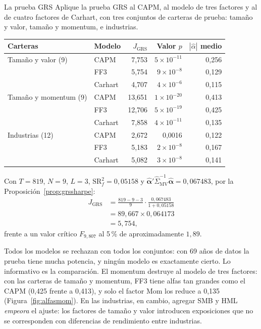 \begin{ejresuelto}{La prueba GRS}\label{ej:grs}
\enunciado Aplique la prueba GRS al CAPM, al modelo de tres factores y al de cuatro factores de Carhart, con tres conjuntos
de carteras de prueba: tamaño y valor, tamaño y momentum, e industrias.

\solucion
{}
\begin{center}\small
\begin{tabular}{@{}llrrr@{}}
\toprule
Carteras & Modelo & $J_{\text{GRS}}$ & Valor $p$ & $|\hat\alpha|$ medio \\
\midrule
Tamaño y valor (9) & CAPM & 7,753 & $5\times10^{-11}$ & 0,256 \\
 & FF3 & 5,754 & $9\times10^{-8}$ & 0,129 \\
 & Carhart & 4,707 & $4\times10^{-6}$ & 0,115 \\
Tamaño y momentum (9) & CAPM & 13,651 & $1\times10^{-20}$ & 0,413 \\
 & FF3 & 12,706 & $5\times10^{-19}$ & 0,425 \\
 & Carhart & 7,858 & $4\times10^{-11}$ & 0,135 \\
Industrias (12) & CAPM & 2,672 & 0,0016 & 0,122 \\
 & FF3 & 5,183 & $2\times10^{-8}$ & 0,167 \\
 & Carhart & 5,082 & $3\times10^{-8}$ & 0,141 \\
\bottomrule
\end{tabular}
\end{center}

 Con $T=819$, $N=9$, $L=3$, $\mathrm{SR}^2_f=0{,}05158$ y
$\hat{\boldsymbol\alpha}'\hat\Sigma_{\text{MV}}^{-1}\hat{\boldsymbol\alpha}=0{,}067483$, por la Proposición~\ref{prop:grssharpe}:
\begin{align*}
  J_{\text{GRS}} &= \frac{819-9-3}{9}\cdot\frac{0{,}067483}{1+0{,}05158}\\
                 &= 89{,}667\times0{,}064173\\
                 &= 5{,}754,
\end{align*}
frente a un valor crítico $F_{9,807}$ al 5\,\% de aproximadamente $1{,}89$.

 Todos los modelos se rechazan con todos los conjuntos: con 69 años de datos la prueba
tiene mucha potencia, y ningún modelo es exactamente cierto. Lo informativo es la comparación. El momentum destruye al
modelo de tres factores: con las carteras de tamaño y momentum, FF3 tiene alfas tan grandes como el CAPM (0,425 frente a
0,413), y solo el factor Mom los reduce a 0,135 (Figura~\ref{fig:alfasmom}). En las industrias, en cambio, agregar SMB y
HML \emph{empeora} el ajuste: los factores de tamaño y valor introducen exposiciones que no se corresponden con
diferencias de rendimiento entre industrias.


\end{ejresuelto}
